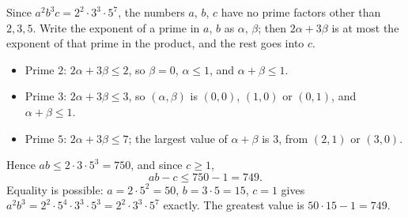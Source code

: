 Since $a^2b^3c=2^2\cdot3^3\cdot5^7$, the numbers $a$, $b$, $c$ have no prime factors other than $2,3,5$. Write the exponent of a prime in $a$, $b$ as $\alpha$, $\beta$; then $2\alpha+3\beta$ is at most the exponent of that prime in the product, and the rest goes into $c$.
\begin{itemize}
\item Prime $2$: $2\alpha+3\beta\le2$, so $\beta=0$, $\alpha\le1$, and $\alpha+\beta\le1$.
\item Prime $3$: $2\alpha+3\beta\le3$, so $(\alpha,\beta)$ is $(0,0)$, $(1,0)$ or $(0,1)$, and $\alpha+\beta\le1$.
\item Prime $5$: $2\alpha+3\beta\le7$; the largest value of $\alpha+\beta$ is $3$, from $(2,1)$ or $(3,0)$.
\end{itemize}
Hence $ab\le2\cdot3\cdot5^3=750$, and since $c\ge1$,
\[
ab-c\le750-1=749 .
\]
Equality is possible: $a=2\cdot5^2=50$, $b=3\cdot5=15$, $c=1$ gives $a^2b^3=2^2\cdot5^4\cdot3^3\cdot5^3=2^2\cdot3^3\cdot5^7$ exactly. The greatest value is $50\cdot15-1=\boxed{749}$.
